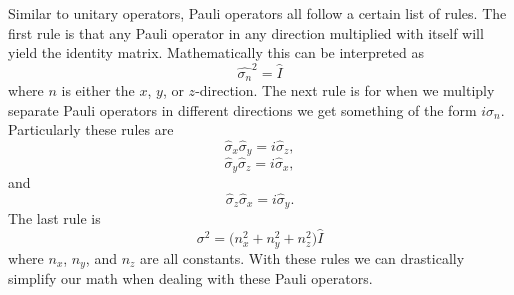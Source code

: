 \documentclass[twocolumn]{article}
\begin{document}
Similar to unitary operators, Pauli operators all follow a certain list of rules. The first rule is that any Pauli operator in any direction multiplied with itself will yield the identity matrix. Mathematically this can be interpreted as
\begin{equation}\label{eq:18}
\hat{\sigma_n}^2=\hat{I}
\end{equation}
where $n$ is either the $x$, $y$, or $z$-direction. The next rule is for when we multiply separate Pauli operators in different directions we get something of the form $i\sigma_n$. Particularly these rules are
\begin{equation}\label{eq:19}
\hat{\sigma}_x\hat{\sigma}_y=i\hat{\sigma}_z,
\end{equation}
\begin{equation}\label{eq:20}
\hat{\sigma}_y\hat{\sigma}_z=i\hat{\sigma}_x,
\end{equation}
and
\begin{equation}\label{eq:21}
\hat{\sigma}_z\hat{\sigma}_x=i\hat{\sigma}_y.
\end{equation}
The last rule is
\begin{equation}\label{eq:22}
\sigma^2=\big(n_x^2+n_y^2+n_z^2\big)\hat{I}
\end{equation}
where $n_x$, $n_y$, and $n_z$ are all constants. With these rules we can drastically simplify our math when dealing with these Pauli operators.
\end{document}
